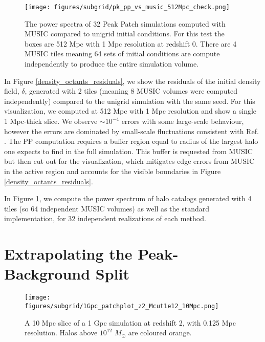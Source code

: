 \begin{figure} %
\begin{center}
\texttt{[image: figures/subgrid/pk\_pp\_vs\_music\_512Mpc\_check.png]}%
\caption{The power spectra of 32 Peak Patch simulations computed with MUSIC compared to unigrid initial conditions. For this test the boxes are 512 Mpc with 1 Mpc resolution at redshift 0. There are 4 MUSIC tiles meaning 64 sets of initial conditions are compute independently to produce the entire simulation volume.}
\label{pkcheck}
\end{center}
\end{figure}

In Figure \ref{density_octants_residuals}, we show the residuals of the initial density field, $\delta$, generated with 2 tiles (meaning 8 MUSIC volumes were computed independently) compared to the unigrid simulation with the same seed. For this visualization, we computed at 512 Mpc with 1 Mpc resolution and show a single 1 Mpc-thick slice. We observe $\sim 10^{-4}$ errors with some large-scale behaviour, however the errors are dominated by small-scale fluctuations consistent with Ref. \cite{music}. The PP computation requires a buffer region equal to radius of the largest halo one expects to find in the full simulation. This buffer is requested from MUSIC but then cut out for the visualization, which mitigates edge errors from MUSIC in the active region and accounts for the visible boundaries in Figure \ref{density_octants_residuals}.

In Figure \ref{pkcheck}, we compute the power spectrum of halo catalogs generated with 4 tiles (so 64 independent MUSIC volumes) as well as the standard implementation, for 32 independent realizations of each method.

\section{Extrapolating the Peak-Background Split}
\label{ch:signal:sec:epbs}

\begin{figure} %
\begin{center}
\texttt{[image: figures/subgrid/1Gpc\_patchplot\_z2\_Mcut1e12\_10Mpc.png]}
\caption{A 10 Mpc slice of a 1 Gpc simulation at redshift 2, with 0.125 Mpc resolution. Halos above $10^{12}$ $M_\odot$ are coloured orange.}
\label{musicslice}
\end{center}
\end{figure}

